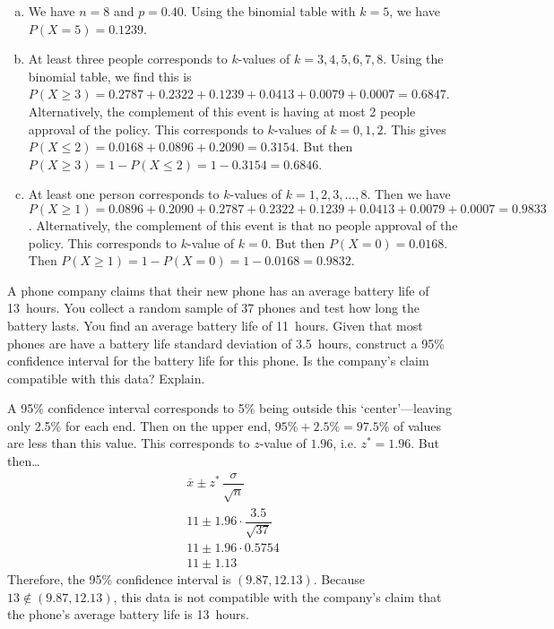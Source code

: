 \documentclass[11pt,letterpaper]{article}
\begin{document}
\sol
\begin{enumerate}[(a)]
\item We have $n= 8$ and $p= 0.40$. Using the binomial table with $k= 5$, we have $P(X= 5)= 0.1239$.

\item At least three people corresponds to $k$-values of $k= 3, 4, 5, 6, 7, 8$. Using the binomial table, we find this is $P(X \geq 3)= 0.2787 + 0.2322 + 0.1239 + 0.0413 + 0.0079 + 0.0007= 0.6847$. Alternatively, the complement of this event is having at most 2 people approval of the policy. This corresponds to $k$-values of $k= 0, 1, 2$. This gives $P(X \leq 2)= 0.0168 + 0.0896 + 0.2090= 0.3154$. But then $P(X \geq 3)= 1 - P(X \leq 2)= 1 - 0.3154= 0.6846$. 

\item At least one person corresponds to $k$-values of $k= 1, 2, 3, \ldots, 8$. Then we have $P(X \geq 1)= 0.0896 + 0.2090 + 0.2787 + 0.2322 + 0.1239 + 0.0413 + 0.0079 + 0.0007= 0.9833$. Alternatively, the complement of this event is that no people approval of the policy. This corresponds to $k$-value of $k= 0$. But then $P(X= 0)= 0.0168$. Then $P(X \geq 1)= 1 - P(X= 0)= 1 - 0.0168= 0.9832$. 
\end{enumerate}





\newpage





 A phone company claims that their new phone has an average battery life of 13~hours. You collect a random sample of 37 phones and test how long the battery lasts. You find an average battery life of 11~hours. Given that most phones are have a battery life standard deviation of 3.5~hours, construct a 95\% confidence interval for the battery life for this phone. Is the company's claim compatible with this data? Explain. \pspace

\sol A 95\% confidence interval corresponds to 5\% being outside this `center'---leaving only 2.5\% for each end. Then on the upper end, $95\% + 2.5\%= 97.5\%$ of values are less than this value. This corresponds to $z$-value of $1.96$, i.e. $z^*= 1.96$. But then\dots
	\[
	\begin{aligned}
	\overline{x} \pm z^*\, \dfrac{\sigma}{\sqrt{n}} \\
	11 \pm 1.96 \cdot \dfrac{3.5}{\sqrt{37}} \\
	11 \pm 1.96 \cdot 0.5754 \\
	11 \pm 1.13
	\end{aligned}
	\]
Therefore, the 95\% confidence interval is $(9.87, 12.13)$. Because $13 \notin (9.87, 12.13)$, this data is not compatible with the company's claim that the phone's average battery life is 13~hours. 
\end{document}
